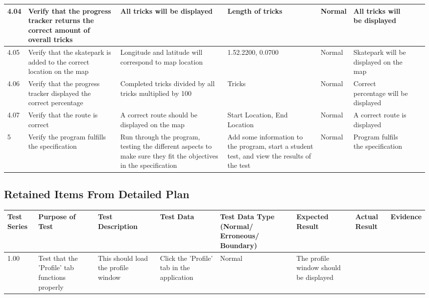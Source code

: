 \begin{landscape}
\begin{center}
\begin{longtable}{|p{1.5cm}|p{2.5cm}|p{2.5cm}|p{2cm}|p{2cm}|p{2cm}|p{2cm}|p{2cm}|}
4.04 & Verify that the progress tracker returns the correct amount of overall tricks & All tricks will be displayed & Length of tricks & Normal & All tricks will be displayed & & \\ \hline

4.05 & Verify that the skatepark is added to the correct location on the map & Longitude and latitude will correspond to map location & 1.52.2200, 0.0700 & Normal & Skatepark will be displayed on the map & & \\ \hline

4.06 & Verify that the progress tracker displayed the correct percentage & Completed tricks divided by all tricks multiplied by 100  & Tricks & Normal & Correct percentage will be displayed & & \\ \hline

4.07 & Verify that the route is correct & A correct route should be displayed on the map & Start Location, End Location & Normal & A correct route is displayed & & \\ \hline



5 & Verify the program fulfills the specification & Run through the program, testing the different aspects to make sure they fit the objectives in the specification & Add some information to the program, start a student test, and view the results of the test & Normal & Program fulfils the specification & & \\ \hline

    \end{longtable}
\end{center}

\subsection{Retained Items From Detailed Plan}

\begin{center}
    \begin{longtable}{|p{1.5cm}|p{2.5cm}|p{2.5cm}|p{2cm}|p{2cm}|p{2cm}|p{2cm}|p{2cm}|}
        \hline
        \textbf{Test Series} & \textbf{Purpose of Test} & \textbf{Test Description} & \textbf{Test Data} & \textbf{Test Data Type (Normal/ Erroneous/ Boundary)} & \textbf{Expected Result} & \textbf{Actual Result} & \textbf{Evidence}\\ \hline
1.00 & Test that the 'Profile' tab functions properly & This should load the profile window & Click the 'Profile' tab in the application & Normal & The profile window should be displayed & &  \\ \hline


\end{longtable}
\end{center}
\end{landscape}
